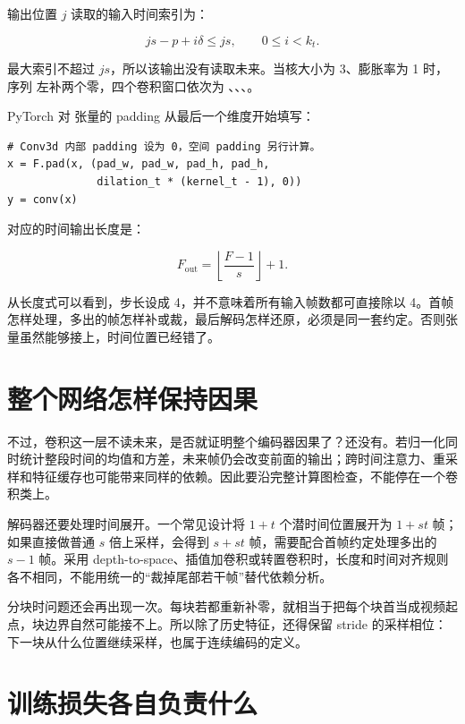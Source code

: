 输出位置 \(j\) 读取的输入时间索引为：

\[
js-p+i\delta\le js,\qquad 0\le i<k_t.
\]

最大索引不超过 \(js\)，所以该输出没有读取未来。当核大小为 3、膨胀率为 1 时，序列 \codepath{[a,b,c,d]} 左补两个零，四个卷积窗口依次为 \codepath{[0,0,a]}、\codepath{[0,a,b]}、\codepath{[a,b,c]}、\codepath{[b,c,d]}。

PyTorch 对  张量的 padding 从最后一个维度开始填写：

\begin{verbatim}
# Conv3d 内部 padding 设为 0，空间 padding 另行计算。
x = F.pad(x, (pad_w, pad_w, pad_h, pad_h,
              dilation_t * (kernel_t - 1), 0))
y = conv(x)
\end{verbatim}

对应的时间输出长度是：

\[
F_{\mathrm{out}}=\left\lfloor\frac{F-1}{s}\right\rfloor+1.
\]

从长度式可以看到，步长设成 4，并不意味着所有输入帧数都可直接除以 4。首帧怎样处理，多出的帧怎样补或裁，最后解码怎样还原，必须是同一套约定。否则张量虽然能够接上，时间位置已经错了。

\section{整个网络怎样保持因果}\label{seedance-m01-ux6574ux4e2aux7f51ux7edcux600eux6837ux4fddux6301ux56e0ux679c}

不过，卷积这一层不读未来，是否就证明整个编码器因果了？还没有。若归一化同时统计整段时间的均值和方差，未来帧仍会改变前面的输出；跨时间注意力、重采样和特征缓存也可能带来同样的依赖。因此要沿完整计算图检查，不能停在一个卷积类上。

解码器还要处理时间展开。一个常见设计将 \(1+t\) 个潜时间位置展开为 \(1+st\) 帧；如果直接做普通 \(s\) 倍上采样，会得到 \(s+st\) 帧，需要配合首帧约定处理多出的 \(s-1\) 帧。采用 depth-to-space、插值加卷积或转置卷积时，长度和时间对齐规则各不相同，不能用统一的``裁掉尾部若干帧''替代依赖分析。

分块时问题还会再出现一次。每块若都重新补零，就相当于把每个块首当成视频起点，块边界自然可能接不上。所以除了历史特征，还得保留 stride 的采样相位：下一块从什么位置继续采样，也属于连续编码的定义。

\section{训练损失各自负责什么}\label{seedance-m01-ux8badux7ec3ux635fux5931ux5404ux81eaux8d1fux8d23ux4ec0ux4e48}

